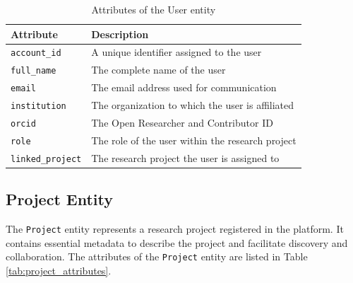 \documentclass{article}
\begin{document}
\begin{table}[h]
      \centering
      \caption{Attributes of the User entity}
      \label{tab:user_attributes}
      \begin{tabular}{|l|l|}
            \hline
            \textbf{Attribute}       & \textbf{Description}                             \\ \hline
            \texttt{account\_id}     & A unique identifier assigned to the user         \\ \hline
            \texttt{full\_name}      & The complete name of the user                    \\ \hline
            \texttt{email}           & The email address used for communication         \\ \hline
            \texttt{institution}     & The organization to which the user is affiliated \\ \hline
            \texttt{orcid}           & The Open Researcher and Contributor ID           \\ \hline
            \texttt{role}            & The role of the user within the research project \\ \hline
            \texttt{linked\_project} & The research project the user is assigned to     \\ \hline
      \end{tabular}
\end{table}

\subsection{Project Entity}
The \texttt{Project} entity represents a research project registered in the platform. It contains essential metadata to describe the project and facilitate discovery and collaboration. The attributes of the \texttt{Project} entity are listed in Table \ref{tab:project_attributes}.
\end{document}
